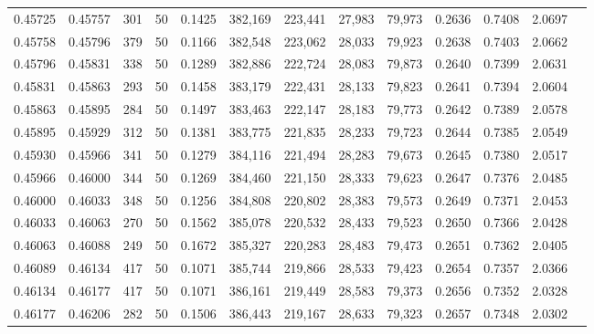\begin{tabular}{rrrrrrrrrrrrr}
0.45725 & 0.45757 &   301 &  50 &                                     0.1425 & 382,169 & 223,441 &  27,983 &  79,973 & 0.2636 & 0.7408 & 2.0697 \\
0.45758 & 0.45796 &   379 &  50 &                                     0.1166 & 382,548 & 223,062 &  28,033 &  79,923 & 0.2638 & 0.7403 & 2.0662 \\
0.45796 & 0.45831 &   338 &  50 &                                     0.1289 & 382,886 & 222,724 &  28,083 &  79,873 & 0.2640 & 0.7399 & 2.0631 \\
0.45831 & 0.45863 &   293 &  50 &                                     0.1458 & 383,179 & 222,431 &  28,133 &  79,823 & 0.2641 & 0.7394 & 2.0604 \\
0.45863 & 0.45895 &   284 &  50 &                                     0.1497 & 383,463 & 222,147 &  28,183 &  79,773 & 0.2642 & 0.7389 & 2.0578 \\
0.45895 & 0.45929 &   312 &  50 &                                     0.1381 & 383,775 & 221,835 &  28,233 &  79,723 & 0.2644 & 0.7385 & 2.0549 \\
0.45930 & 0.45966 &   341 &  50 &                                     0.1279 & 384,116 & 221,494 &  28,283 &  79,673 & 0.2645 & 0.7380 & 2.0517 \\
0.45966 & 0.46000 &   344 &  50 &                                     0.1269 & 384,460 & 221,150 &  28,333 &  79,623 & 0.2647 & 0.7376 & 2.0485 \\
0.46000 & 0.46033 &   348 &  50 &                                     0.1256 & 384,808 & 220,802 &  28,383 &  79,573 & 0.2649 & 0.7371 & 2.0453 \\
0.46033 & 0.46063 &   270 &  50 &                                     0.1562 & 385,078 & 220,532 &  28,433 &  79,523 & 0.2650 & 0.7366 & 2.0428 \\
0.46063 & 0.46088 &   249 &  50 &                                     0.1672 & 385,327 & 220,283 &  28,483 &  79,473 & 0.2651 & 0.7362 & 2.0405 \\
0.46089 & 0.46134 &   417 &  50 &                                     0.1071 & 385,744 & 219,866 &  28,533 &  79,423 & 0.2654 & 0.7357 & 2.0366 \\
0.46134 & 0.46177 &   417 &  50 &                                     0.1071 & 386,161 & 219,449 &  28,583 &  79,373 & 0.2656 & 0.7352 & 2.0328 \\
0.46177 & 0.46206 &   282 &  50 &                                     0.1506 & 386,443 & 219,167 &  28,633 &  79,323 & 0.2657 & 0.7348 & 2.0302 \\

\end{tabular}

